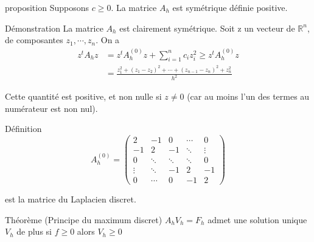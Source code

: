 \documentclass{beamer}
\begin{document}
 \begin{frame} 
 \begin{block}{proposition}
 Supposons $c \geqslant 0$. La matrice $A_h$ est symétrique définie positive.
 \end{block}


Démonstration La matrice $A_h$ est clairement symétrique. Soit z un vecteur de $\mathbb{R}^n$, de composantes $z_1,\cdots ,z_n$. On a
\[\begin{array}{ll}
z^t A_h z & = z^t A_h^{(0)} z  +\sum_{i=1}^nc_i z_i^2 \geqslant z^t A_h^{(0)} z\\
                & = \frac{z_1^2+(z_1-z_2)^2+\cdots +(z_{n-1}-z_n)^2+z_n^2}{h^2} 
\end{array} \]


Cette quantité est positive, et non nulle si $z \neq 0$ (car au moins l'un des termes au numérateur est non nul).

  \end{frame} 
  
  \begin{frame}
\begin{block}{Définition}
\[A_h^{(0)}=
\left(\begin{array}{ccccc}
2&-1&0&\cdots&0\\
-1&2&-1&\ddots&\vdots\\
0&  \ddots &\ddots&\ddots&0\\
\vdots &\ddots &-1&2&-1\\
   0&\cdots &0&-1 &2
\end{array}\right)
\] 

est la matrice du Laplacien discret.
\end{block}
\begin{block}{Théorème (Principe du maximum discret)}
$A_h V_h =F_h$ admet une solution unique $V_h$ de plus si $f\geq 0$ alors $V_h\geq 0$
\end{block}



\end{frame}
\end{document}
